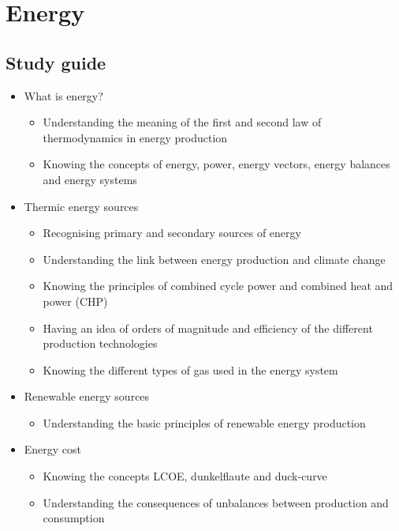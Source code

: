 \documentclass[../summary.tex]{subfiles}
\begin{document}
\section{Energy}

\subsection{Study guide}
\begin{itemize}
	\setlength{\itemsep}{0pt}

	\item What is energy?
	      \begin{itemize}
		      \item Understanding the meaning of the first and second law of thermodynamics in energy production
		      \item Knowing the concepts of energy, power, energy vectors, energy balances and energy systems
	      \end{itemize}

	\item Thermic energy sources
	      \begin{itemize}
		      \item Recognising primary and secondary sources of energy
		      \item Understanding the link between energy production and climate change
		      \item Knowing the principles of combined cycle power and combined heat and power (CHP)
		      \item Having an idea of orders of magnitude and efficiency of the different production technologies
		      \item Knowing the different types of gas used in the energy system
	      \end{itemize}

	\item Renewable energy sources
	      \begin{itemize}
		      \item Understanding the basic principles of renewable energy production
	      \end{itemize}

	\item Energy cost
	      \begin{itemize}
		      \item Knowing the concepts LCOE, dunkelflaute and duck-curve
		      \item Understanding the consequences of unbalances between production and consumption
	      \end{itemize}


\end{itemize}
\end{document}
